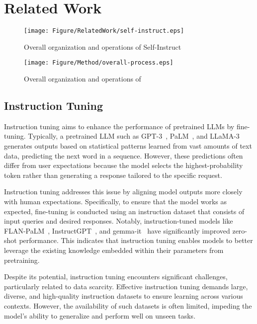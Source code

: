 \section{Related Work}
\label{sec:relatedwork}

\begin{figure}[b]
    \centering
    \texttt{[image: Figure/RelatedWork/self-instruct.eps]}
    \caption{Overall organization and operations of Self-Instruct}
    \label{fig:self-instruct}
\end{figure}

\begin{figure*}[t!]%
	\centering
	\texttt{[image: Figure/Method/overall-process.eps]}
	\caption{Overall organization and operations of \ours{}}%
	\label{fig:sedi-instruct}%
\end{figure*}
\subsection{Instruction Tuning}
Instruction tuning aims to enhance the performance of pretrained LLMs by
fine-tuning. Typically, a pretrained LLM such as GPT-3~\cite{gpt3},
PaLM~\cite{PaLM}, and LLaMA-3~\cite{llama3} generates outputs based
on statistical patterns learned from vast amounts of text data, predicting the
next word in a sequence. However, these predictions often differ from user
expectations because the model selects the highest-probability token rather than
generating a response tailored to the specific request.







Instruction tuning addresses this issue by aligning model outputs more closely
with human expectations. Specifically, to ensure that the model works as
expected, 
fine-tuning is conducted using 
an instruction dataset that consists of input queries and desired responses.
Notably, instruction-tuned models like FLAN-PaLM~\cite{FLAM},
InstructGPT~\cite{InstructGPT}, and gemma-it~\cite{gemmait} have significantly
improved zero-shot performance. This indicates that instruction tuning enables
models to better leverage the existing knowledge embedded within their parameters
from pretraining.



Despite its potential, instruction tuning encounters significant challenges,
particularly related to data scarcity. Effective instruction tuning demands
large, diverse, and high-quality instruction datasets to ensure learning across
various contexts. However, the availability of such datasets is often limited,
impeding the model's ability to generalize and perform well on unseen tasks.


